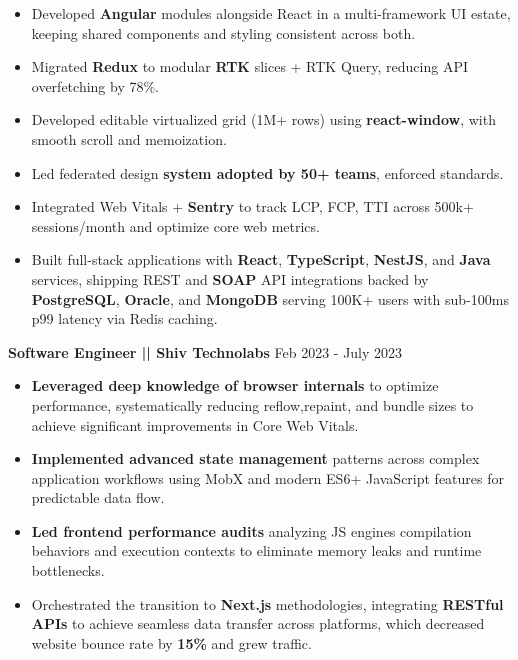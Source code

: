 \documentclass[a4paper]{article}
\begin{document}
\begin{itemize}
\item {Developed \textbf{Angular} modules alongside React in a multi-framework UI estate, keeping shared components and styling consistent across both.}
\item {Migrated \textbf{Redux} to modular \textbf{RTK} slices + RTK Query, reducing API overfetching by 78\%.}
\item {Developed editable virtualized grid (1M+ rows) using \textbf{react-window}, with smooth scroll and memoization.}
\item {Led federated design \textbf{system adopted by 50+ teams}, enforced standards.}
\item {Integrated Web Vitals + \textbf{Sentry} to track LCP, FCP, TTI across 500k+ sessions/month and optimize core web metrics.}
\item {Built full-stack applications with \textbf{React}, \textbf{TypeScript}, \textbf{NestJS}, and \textbf{Java} services, shipping REST and \textbf{SOAP} API integrations backed by \textbf{PostgreSQL}, \textbf{Oracle}, and \textbf{MongoDB} serving 100K+ users with sub-100ms p99 latency via Redis caching.}
\end{itemize}




\vspace{4pt}
\textbf{Software Engineer || Shiv Technolabs}
\hfill Feb 2023 - July 2023
\begin{itemize}
\vspace{1pt}

\item {\textbf{Leveraged deep knowledge of browser internals} to optimize performance, systematically reducing reflow,repaint, and bundle sizes to achieve significant improvements in Core Web Vitals.}
\item {\textbf{Implemented advanced state management} patterns across complex application workflows using MobX and modern ES6+ JavaScript features for predictable data flow.}
\item {\textbf{Led frontend performance audits} analyzing JS engines compilation behaviors and execution contexts to eliminate memory leaks and runtime bottlenecks.}
\item {Orchestrated the transition to \textbf{Next.js} methodologies, integrating \textbf{RESTful APIs} to achieve seamless data transfer across platforms, which decreased website bounce rate by \textbf{15\%} and grew traffic.}
\end{itemize}
\end{document}
